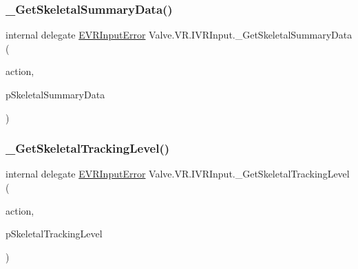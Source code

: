 \mbox{\label{struct_valve_1_1_v_r_1_1_i_v_r_input_ae852c5f41c5b1d36119e74ee6dbad779}} 
\subsubsection{\texorpdfstring{\_GetSkeletalSummaryData()}{\_GetSkeletalSummaryData()}}
{\footnotesize\ttfamily internal delegate \mbox{\hyperlink{namespace_valve_1_1_v_r_a592d7f4189b8346d6c96dbdbaa35bc1b}{E\+V\+R\+Input\+Error}} Valve.\+V\+R.\+I\+V\+R\+Input.\+\_\+\+Get\+Skeletal\+Summary\+Data (\begin{DoxyParamCaption}\item[{ulong}]{action,  }\item[{ref \mbox{\hyperlink{struct_valve_1_1_v_r_1_1_v_r_skeletal_summary_data__t}{V\+R\+Skeletal\+Summary\+Data\+\_\+t}}}]{p\+Skeletal\+Summary\+Data }\end{DoxyParamCaption})}

\mbox{\label{struct_valve_1_1_v_r_1_1_i_v_r_input_a0521ebd1a374c8e54ca2864d7b6d57eb}} 
\subsubsection{\texorpdfstring{\_GetSkeletalTrackingLevel()}{\_GetSkeletalTrackingLevel()}}
{\footnotesize\ttfamily internal delegate \mbox{\hyperlink{namespace_valve_1_1_v_r_a592d7f4189b8346d6c96dbdbaa35bc1b}{E\+V\+R\+Input\+Error}} Valve.\+V\+R.\+I\+V\+R\+Input.\+\_\+\+Get\+Skeletal\+Tracking\+Level (\begin{DoxyParamCaption}\item[{ulong}]{action,  }\item[{ref \mbox{\hyperlink{namespace_valve_1_1_v_r_a6f46bd50fb65255d6537ab32a6bddc30}{E\+V\+R\+Skeletal\+Tracking\+Level}}}]{p\+Skeletal\+Tracking\+Level }\end{DoxyParamCaption})}

\mbox{\label{struct_valve_1_1_v_r_1_1_i_v_r_input_abe386c0a304c243f737dbfda0340428a}} 
